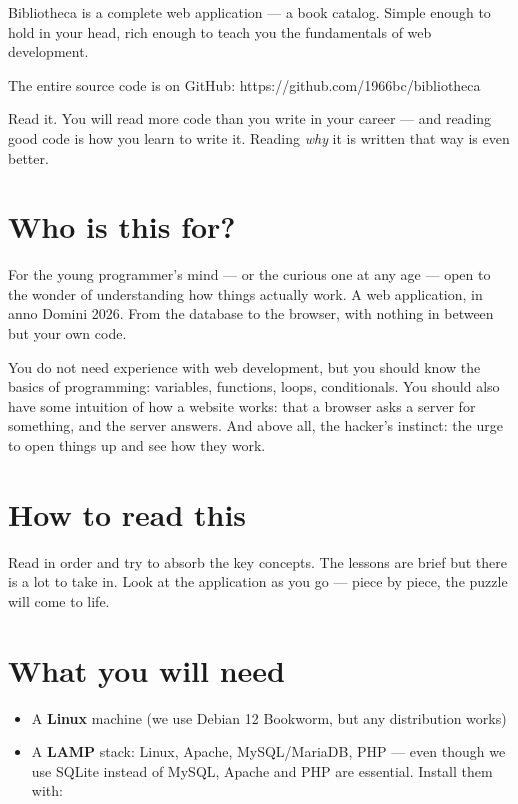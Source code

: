 \documentclass[11pt,a4paper,oneside]{book}
\providecommand{\tightlist}{%
  \setlength{\itemsep}{0pt}\setlength{\parskip}{0pt}}
\begin{document}
Bibliotheca is a complete web application --- a book catalog.
Simple enough to hold in your head, rich enough to teach you the
fundamentals of web development.

The entire source code is on GitHub:
https://github.com/1966bc/bibliotheca

Read it. You will read more code than you write in your career
--- and reading good code is how you learn to write it. Reading
\emph{why} it is written that way is even better.

\hypertarget{who-is-this-for}{%
\section{Who is this for?}\label{who-is-this-for}}

For the young programmer's mind --- or the curious one at any age
--- open to the wonder of understanding how things actually work.
A web application, in anno Domini 2026. From the database to the
browser, with nothing in between but your own code.

You do not need experience with web development, but you should
know the basics of programming: variables, functions, loops,
conditionals. You should also have some intuition of how a
website works: that a browser asks a server for something, and
the server answers. And above all, the hacker's instinct: the
urge to open things up and see how they work.

\hypertarget{how-to-read-this}{%
\section{How to read this}\label{how-to-read-this}}

Read in order and try to absorb the key concepts. The lessons are
brief but there is a lot to take in. Look at the application as
you go --- piece by piece, the puzzle will come to life.

\hypertarget{what-you-will-need-1}{%
\section{What you will need}\label{what-you-will-need-1}}

\begin{itemize}
\tightlist
\item
  A \textbf{Linux} machine (we use Debian 12 Bookworm, but any
  distribution works)
\item
  A \textbf{LAMP} stack: Linux, Apache, MySQL/MariaDB, PHP ---
  even though we use SQLite instead of MySQL, Apache and PHP are
  essential. Install them with:
\end{itemize}
\end{document}

